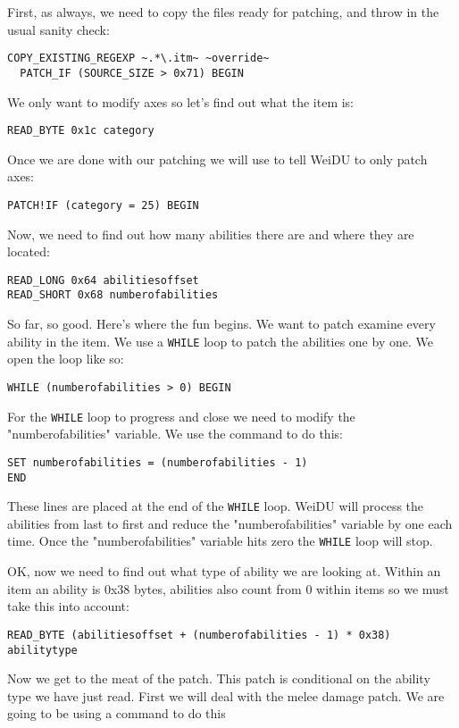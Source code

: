 \documentclass{article}
\def\ttref#1{\ahrefloc{#1}{\tt #1}}
\def\t#1{{\tt #1}}
\begin{document}
First, as always, we need to copy the files ready for patching, and throw
in the usual sanity check:
\begin{verbatim}
COPY_EXISTING_REGEXP ~.*\.itm~ ~override~
  PATCH_IF (SOURCE_SIZE > 0x71) BEGIN
\end{verbatim}
We only want to modify axes so let's find out what the item is:
\begin{verbatim}
READ_BYTE 0x1c category
\end{verbatim}
Once we are done with our patching we will use \ttref{PATCH!IF} to tell
WeiDU to only patch axes:

\begin{verbatim}
PATCH!IF (category = 25) BEGIN
\end{verbatim}
Now, we need to find out how many abilities there are and where they are
located:
\begin{verbatim}
READ_LONG 0x64 abilitiesoffset
READ_SHORT 0x68 numberofabilities
\end{verbatim}
So far, so good. Here's where the fun begins. We want to patch examine
every ability in the item. We use a \t{WHILE} loop to patch the
abilities one by one. We open the loop like so:
\begin{verbatim}
WHILE (numberofabilities > 0) BEGIN
\end{verbatim}
For the \t{WHILE} loop to progress and close we need to modify the
"numberofabilities" variable. We use the \ttref{SET} command to do this:

\begin{verbatim}
SET numberofabilities = (numberofabilities - 1)
END
\end{verbatim}
These lines are placed at the end of the \t{WHILE} loop. WeiDU will
process the abilities from last to first and reduce the "numberofabilities"
variable by one each time. Once the "numberofabilities" variable hits zero the
\t{WHILE} loop will stop.

OK, now we need to find out what type of ability we are looking at. Within
an item an ability is 0x38 bytes, abilities also count from 0 within items
so we must take this into account:
\begin{verbatim}
READ_BYTE (abilitiesoffset + (numberofabilities - 1) * 0x38) abilitytype
\end{verbatim}
Now we get to the meat of the patch. This patch is conditional on the
ability type we have just read. First we will deal with the melee damage
patch. We are going to be using a \ttref{PATCH!IF} command to do this
\end{document}
